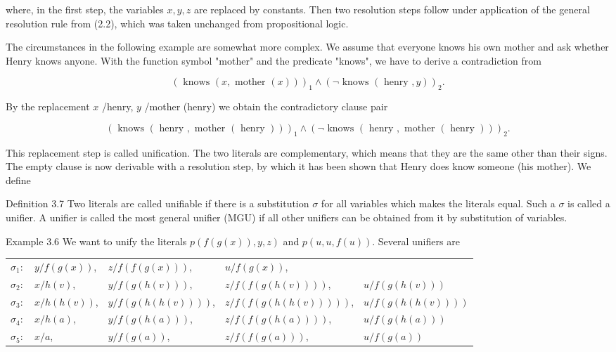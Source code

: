 \documentclass[10pt]{book}
\begin{document}
where, in the first step, the variables $x, y, z$ are replaced by constants. Then two resolution steps follow under application of the general resolution rule from (2.2), which was taken unchanged from propositional logic.

The circumstances in the following example are somewhat more complex. We assume that everyone knows his own mother and ask whether Henry knows anyone. With the function symbol "mother" and the predicate "knows", we have to derive a contradiction from

$$
(\text { knows }(x, \text { mother }(x)))_{1} \wedge(\neg \text { knows }(\text { henry }, y))_{2} .
$$

By the replacement $x$ /henry, $y$ /mother (henry) we obtain the contradictory clause pair

$$
(\text { knows }(\text { henry }, \text { mother }(\text { henry })))_{1} \wedge(\neg \text { knows }(\text { henry }, \text { mother }(\text { henry })))_{2} .
$$

This replacement step is called unification. The two literals are complementary, which means that they are the same other than their signs. The empty clause is now derivable with a resolution step, by which it has been shown that Henry does know someone (his mother). We define

Definition 3.7 Two literals are called unifiable if there is a substitution $\sigma$ for all variables which makes the literals equal. Such a $\sigma$ is called a unifier. A unifier is called the most general unifier (MGU) if all other unifiers can be obtained from it by substitution of variables.


Example 3.6 We want to unify the literals $p(f(g(x)), y, z)$ and $p(u, u, f(u))$. Several unifiers are

\begin{center}
\begin{tabular}{lllll}
$\sigma_{1}:$ & $y / f(g(x))$, & $z / f(f(g(x)))$, & $u / f(g(x))$, &  \\
$\sigma_{2}:$ & $x / h(v)$, & $y / f(g(h(v)))$, & $z / f(f(g(h(v))))$, & $u / f(g(h(v)))$ \\
$\sigma_{3}:$ & $x / h(h(v))$, & $y / f(g(h(h(v))))$, & $z / f(f(g(h(h(v)))))$, & $u / f(g(h(h(v))))$ \\
$\sigma_{4}:$ & $x / h(a)$, & $y / f(g(h(a)))$, & $z / f(f(g(h(a))))$, & $u / f(g(h(a)))$ \\
$\sigma_{5}:$ & $x / a$, & $y / f(g(a))$, & $z / f(f(g(a)))$, & $u / f(g(a))$ \\
\end{tabular}
\end{center}
\end{document}

